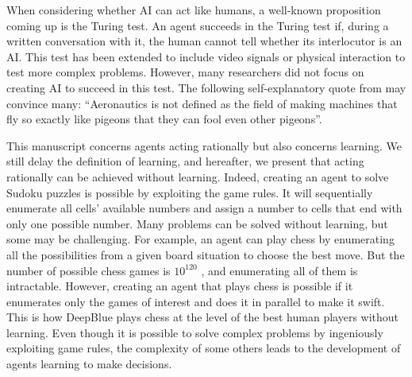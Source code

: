 When considering whether AI can act like humans, a well-known proposition coming up is the Turing test.
An agent succeeds in the Turing test if, during a written conversation with it, the human cannot tell whether its interlocutor is an AI.
This test has been extended to include video signals or physical interaction to test more complex problems.
However, many researchers did not focus on creating AI to succeed in this test.
The following self-explanatory quote from \cite{russel2010} may convince many: ``Aeronautics is not defined as the field of making machines that fly so exactly like pigeons that they can fool even other pigeons''.

This manuscript concerns agents acting rationally but also concerns learning.
We still delay the definition of learning, and hereafter, we present that acting rationally can be achieved without learning.
Indeed, creating an agent to solve Sudoku puzzles is possible by exploiting the game rules.
It will sequentially enumerate all cells' available numbers and assign a number to cells that end with only one possible number.
Many problems can be solved without learning, but some may be challenging.
For example, an agent can play chess by enumerating all the possibilities from a given board situation to choose the best move.
But the number of possible chess games is $10^{120}$ \citep{shannon1950}, and enumerating all of them is intractable.
However, creating an agent that plays chess is possible if it enumerates only the games of interest and does it in parallel to make it swift.
This is how DeepBlue \citep{campbell2002deep} plays chess at the level of the best human players without learning.
Even though it is possible to solve complex problems by ingeniously exploiting game rules, the complexity of some others leads to the development of agents learning to make decisions.

